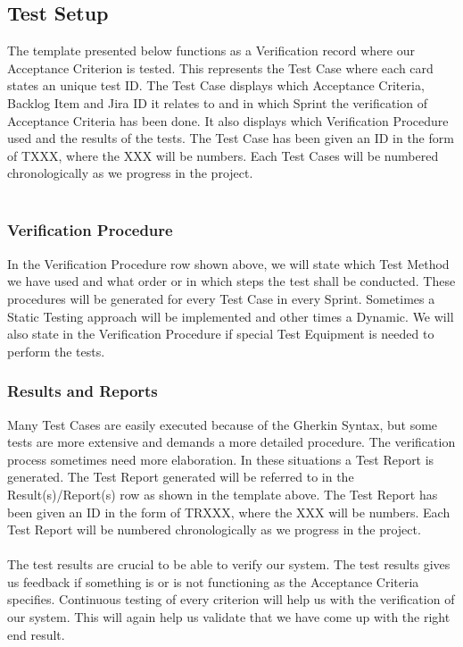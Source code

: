 \newpage

\subsection {Test Setup}
The template presented below functions as a Verification record where our Acceptance Criterion is tested. This represents the Test Case where each card states an unique test ID. The Test Case displays which Acceptance Criteria, Backlog Item and Jira ID it relates to and in which Sprint the verification of Acceptance Criteria has been done. It also displays which Verification Procedure used and the results of the tests. The Test Case has been given an ID in the form of TXXX, where the XXX will be numbers. Each Test Cases will be numbered chronologically as we progress in the project. \\
\\

\subsubsection{Verification Procedure}
In the Verification Procedure row shown above, we will state which Test Method we have used and what order or in which steps the test shall be conducted. These procedures will be generated for every Test Case in every Sprint. Sometimes a Static Testing approach will be implemented and other times a Dynamic. We will also state in the Verification Procedure if special Test Equipment is needed to perform the tests.
\\
\subsubsection{Results and Reports}
Many Test Cases are easily executed because of the Gherkin Syntax, but some tests are more extensive and demands a more detailed procedure. The verification process sometimes need more elaboration. In these situations a Test Report is generated. The Test Report generated will be referred to in the Result(s)/Report(s) row as shown in the template above. The Test Report has been given an ID in the form of TRXXX, where the XXX will be numbers. Each Test Report will be numbered chronologically as we progress in the project. \\ 
\\
The test results are crucial to be able to verify our system. The test results gives us feedback if something is or is not functioning as the Acceptance Criteria specifies. Continuous testing of every criterion will help us with the verification of our system. This will again help us validate that we have come up with the right end result.\\
\newpage

